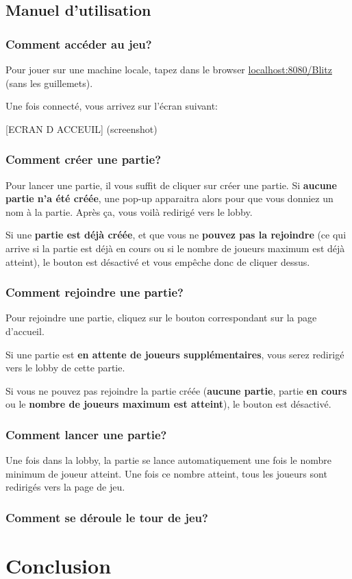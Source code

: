 \documentclass[11pt]{scrreprt}
\begin{document}
    \section{Manuel d'utilisation}
    \subsection{Comment accéder au jeu?}
    Pour jouer sur une machine locale, tapez dans le browser \og \url{localhost:8080/Blitz}\fg{} (sans les guillemets).

    Une fois connecté, vous arrivez sur l'écran suivant:

    [ECRAN D ACCEUIL] (screenshot)

    \subsection{Comment créer une partie?}
    Pour lancer une partie, il vous suffit de cliquer sur créer une partie.
    Si \textbf{aucune partie n'a été créée}, une pop-up apparaitra alors pour que vous donniez un nom à la partie. Après ça, vous voilà redirigé vers le lobby.

    Si une \textbf{partie est déjà créée}, et que vous ne \textbf{pouvez pas la rejoindre} (ce qui arrive si la partie est déjà en cours ou si le nombre de joueurs maximum est déjà atteint), le bouton est désactivé et vous empêche donc de cliquer dessus.

    \subsection{Comment rejoindre une partie?}
    Pour rejoindre une partie, cliquez sur le bouton correspondant sur la page d'accueil.

    Si une partie est \textbf{en attente de joueurs supplémentaires}, vous serez redirigé vers le lobby de cette partie.

    Si vous ne pouvez pas rejoindre la partie créée (\textbf{aucune partie}, partie \textbf{en cours} ou le \textbf{nombre de joueurs maximum est atteint}), le bouton est désactivé.

    \subsection{Comment lancer une partie?}
    Une fois dans la lobby, la partie se lance automatiquement une fois le nombre minimum de joueur atteint. Une fois ce nombre atteint, tous les joueurs sont redirigés vers la page de jeu.

    \subsection{Comment se déroule le tour de jeu?}

    \chapter{Conclusion}
\end{document}
